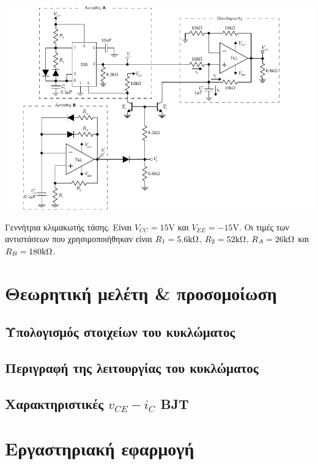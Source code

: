 \begin{center}
	\begin{circuitfig}[H]
		\centering
		\includegraphics[width=14cm]{circuits/micro3_lab2.pdf}
		\caption{Γεννήτρια κλιμακωτής τάσης. Είναι $V_{CC}=15\unit{\volt}$ και $V_{EE}=-15\unit{\volt}$. Οι τιμές των αντιστάσεων που χρησιμοποιήθηκαν είναι $R_1=5.6\kohm$, $R_2=52\kohm$, $R_A=26\kohm$ και $R_B=180\kohm$.}
		\label{circ:2_schematic}
	\end{circuitfig}
\end{center}

\section{Θεωρητική μελέτη \& προσομοίωση}

	\subsection{Υπολογισμός στοιχείων του κυκλώματος}
		

	\subsection{Περιγραφή της λειτουργίας του κυκλώματος}
		

	\subsection{Χαρακτηριστικές $v_{CE}-i_C$ BJT}
		

\newpage
\section{Εργαστηριακή εφαρμογή}
	